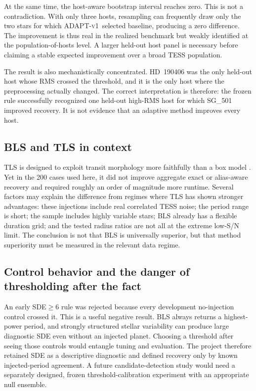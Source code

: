 \documentclass[11pt]{article}
\newcommand{\adapt}{\textsc{ADAPT-v1}}
\newcommand{\sg}[1]{\textsc{SG\_#1}}
\begin{document}
At the same time, the host-aware bootstrap interval reaches zero. This is not a contradiction. With only three hosts, resampling can frequently draw only the two stars for which \adapt\ selected baseline, producing a zero difference. The improvement is thus real in the realized benchmark but weakly identified at the population-of-hosts level. A larger held-out host panel is necessary before claiming a stable expected improvement over a broad TESS population.

The result is also mechanistically concentrated. HD~190406 was the only held-out host whose RMS crossed the threshold, and it is the only host where the preprocessing actually changed. The correct interpretation is therefore: the frozen rule successfully recognized one held-out high-RMS host for which \sg{501} improved recovery. It is not evidence that an adaptive method improves every host.

\subsection{BLS and TLS in context}
TLS is designed to exploit transit morphology more faithfully than a box model \cite{HippkeHeller2019}. Yet in the 200 cases used here, it did not improve aggregate exact or alias-aware recovery and required roughly an order of magnitude more runtime. Several factors may explain the difference from regimes where TLS has shown stronger advantages: these injections include real correlated TESS noise; the period range is short; the sample includes highly variable stars; BLS already has a flexible duration grid; and the tested radius ratios are not all at the extreme low-S/N limit. The conclusion is not that BLS is universally superior, but that method superiority must be measured in the relevant data regime.

\subsection{Control behavior and the danger of thresholding after the fact}
An early SDE$\geq6$ rule was rejected because every development no-injection control crossed it. This is a useful negative result. BLS always returns a highest-power period, and strongly structured stellar variability can produce large diagnostic SDE even without an injected planet. Choosing a threshold after seeing those controls would entangle tuning and evaluation. The project therefore retained SDE as a descriptive diagnostic and defined recovery only by known injected-period agreement. A future candidate-detection study would need a separately designed, frozen threshold-calibration experiment with an appropriate null ensemble.
\end{document}

